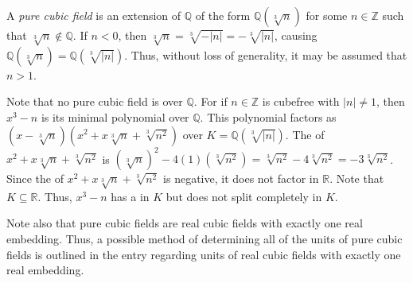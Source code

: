 \documentclass[12pt]{article}
\begin{document}
A {\sl pure cubic field\/} is an extension of $\mathbb{Q}$ of the form $\mathbb{Q}(\sqrt[3]{n})$ for some $n \in \mathbb{Z}$ such that $\sqrt[3]{n} \notin \mathbb{Q}$.  If $n<0$, then $\sqrt[3]{n}=\sqrt[3]{-|n|}=-\sqrt[3]{|n|}$, causing $\mathbb{Q}(\sqrt[3]{n})=\mathbb{Q}(\sqrt[3]{|n|})$.  Thus, without loss of generality, it may be assumed that $n>1$.

Note that no pure cubic field is  over $\mathbb{Q}$.  For if $n \in \mathbb{Z}$ is cubefree with $|n| \neq 1$, then $x^3-n$ is its minimal polynomial over $\mathbb{Q}$.  This polynomial factors as $(x-\sqrt[3]{n})(x^2+x\sqrt[3]{n}+\sqrt[3]{n^2})$ over $K=\mathbb{Q}(\sqrt[3]{|n|})$.  The  of $x^2+x\sqrt[3]{n}+\sqrt[3]{n^2}$ is $\left( \sqrt[3]{n} \right)^2-4(1)\left( \sqrt[3]{n^2} \right)=\sqrt[3]{n^2}-4\sqrt[3]{n^2}=-3\sqrt[3]{n^2}$.  Since the  of $x^2+x\sqrt[3]{n}+\sqrt[3]{n^2}$ is negative, it does not factor in $\mathbb{R}$.  Note that $K \subseteq \mathbb{R}$.  Thus, $x^3-n$ has a  in $K$ but does not split completely in $K$.

Note also that pure cubic fields are real cubic fields with exactly one real embedding.  Thus, a possible method of determining all of the units of pure cubic fields is outlined in the entry regarding units of real cubic fields with exactly one real embedding.
\end{document}
